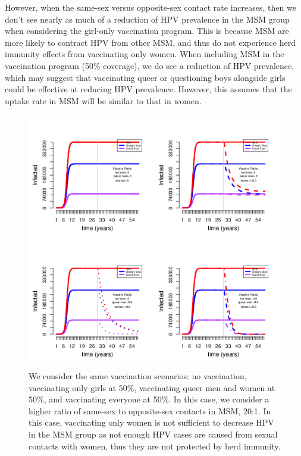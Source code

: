 \documentclass[12pt]{article}
\begin{document}
However, when the same-sex versus opposite-sex contact rate increases, then we don't see nearly as much of a reduction of HPV prevalence in the MSM group when considering the girl-only vaccination program.  This is because MSM are more likely to contract HPV from other MSM, and thus do not experience herd immunity effects from vaccinating only women.  When including MSM in the vaccination program (50\% coverage), we do see a reduction of HPV prevalence, which may suggest that vaccinating queer or questioning boys alongside girls could be effective at reducing HPV prevalence.  However, this assumes that the uptake rate in MSM will be similar to that in women.   

\begin{figure}[h!]
\includegraphics[width=\linewidth]{exampleFig/example2.png}
\caption{We consider the same vaccination scenarios: no vaccination, vaccinating only girls at 50\%, vaccinating queer men and women at 50\%, and vaccinating everyone at 50\%.  In this case, we consider a higher ratio of same-sex to opposite-sex contacts in MSM, 20:1.  In this case, vaccinating only women is not sufficient to decrease HPV in the MSM group as not enough HPV cases are caused from sexual contacts with women, thus they are not protected by herd immunity.}
\label{fig:example2}
\end{figure}
\end{document}
